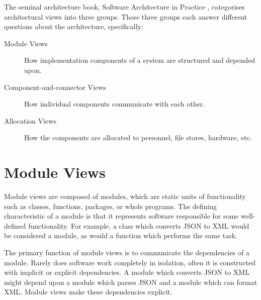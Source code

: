 The seminal architecture book, Software Architecture in Practice \cite{bass2021software},
categorises architectural views into three groups.
These three groups each answer different questions about the architecture, specifically:
\begin{description}
    \item[Module Views] How implementation components of a system are structured and depended upon.
    \item[Component-and-connector Views] How individual components communicate with each other.
    \item[Allocation Views] How the components are allocated to personnel, file stores, hardware, etc.
\end{description}

\section{Module Views}
Module views are composed of modules, which are static units of functionality such as classes, functions, packages, or whole programs.
The defining characteristic of a module is that it represents software responsible for some well-defined functionality.
For example, a class which converts JSON to XML would be considered a module, as would a function which performs the same task.

The primary function of module views is to communicate the dependencies of a module.
Rarely does software work completely in isolation, often it is constructed with implicit or explicit dependencies.
A module which converts JSON to XML might depend upon a module which parses JSON and a module which can format XML.
Module views make these dependencies explicit.

